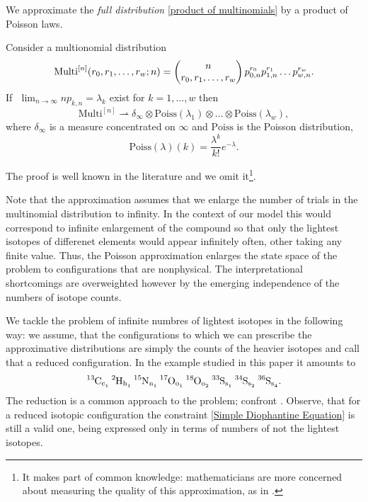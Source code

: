 We approximate the {\it full distribution} \eqref{product of multinomials} by a product of Poisson laws.
	

\begin{lemma}\label{weak convergence of multinomial to Poissons lemma}
	Consider a multionomial distribution 
$$ 
	\mathrm{Multi}^{[n]}(r_0, r_1, \dots, r_w; n) = 
	\begin{pmatrix}
		n \cr r_0, r_1, \dots, r_w
	\end{pmatrix} 
	p_{0,n}^{r_0}  p_{1,n}^{r_1} \dots p_{w,n}^{r_w}.
$$
	If \,\,$\lim_{n\to \infty} n p_{k,n}= \lambda_k$ exist for $k=1,\dots, w$ then 
\begin{equation}\label{weak convergence of multionial to Poissons equation}
	\mathrm{Multi}^{[n]} \rightharpoonup \delta_\infty \otimes \mathrm{Poiss}( \lambda_1) \otimes \dots \otimes \mathrm{Poiss}( \lambda_w ),	
\end{equation}
	where $\delta_\infty$ is a measure concentrated on $\infty$ and $\mathrm{Poiss}$ is the Poisson distribution, 
$$
	\mathrm{Poiss}(\lambda)(k) 	= \frac{\lambda^k}{k!}e^{-\lambda}.
$$
\end{lemma}
The proof is well known in the literature and we omit it\footnote{It makes part of common knowledge: mathematicians are more concerned about measuring the quality of this approximation, as in \cite{Roos1999OnTheRateOfMultivariatePoissonConvergence}.}. 


Note that the approximation assumes that we enlarge the number of trials in the multinomial distribution to infinity. In the context of our model this would correspond to infinite enlargement of the compound so that only the lightest isotopes of differenet elements would appear infinitely often, other taking any finite value. Thus, the Poisson approximation enlarges the state space of the problem to configurations that are nonphysical. The interpretational shortcomings are overweighted however by the emerging independence of the numbers of isotope counts. 


We tackle the problem of infinite numbres of lightest isotopes in the following way: we assume, that the configurations to which we can prescribe the approximative distributions are simply the counts of the heavier isotopes and call that a reduced configuration. In the example studied in this paper it amounts to
\begin{equation}\label{short chemical formula}
	\text{\heavyMoleculeIsotopic}.
\end{equation}
The reduction is a common approach to the problem; confront \cite{Feller1968IntroductionToProbability}. Observe, that for a reduced isotopic configuration the constraint \eqref{Simple Diophantine Equation} is still a valid one, being expressed only in terms of numbers of not the lightest isotopes. 


